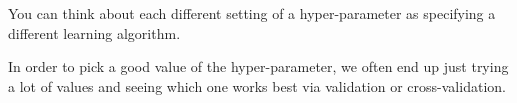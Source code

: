 You can think about each different setting of a hyper-parameter as
specifying a different learning algorithm.

In order to pick a good value of the hyper-parameter, we often end up
just trying a lot of values and seeing which one works best via
validation or cross-validation.





